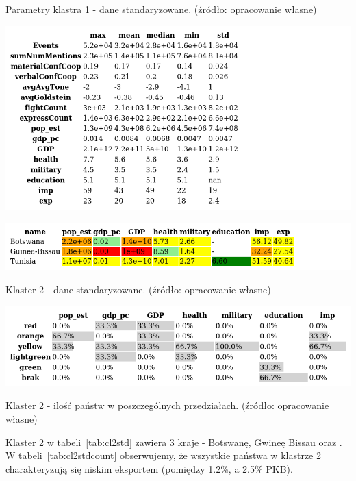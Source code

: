 \documentclass[11pt]{report}
\begin{document}
    \begin{table}[!htp]
        \centering
        \caption{Parametry klastra 1 - dane standaryzowane. (źródło: opracowanie własne)}
        \label{tab:cl1std_desc}
        \includegraphics[width=\linewidth]{tables/CLUST/desc/clust1std_desc.png}
    \end{table}

    \begin{table}[!htp]
        \centering
        \includegraphics[width=\linewidth]{tables/CLUST/cluster2stdkmeans.png}
        \caption{Klaster 2 - dane standaryzowane. (źródło: opracowanie własne)}
        \label{tab:cl2std}
    \end{table}

    \begin{table}[!htp]
        \centering
        \includegraphics[width=\linewidth]{tables/CLUST/cluster2stdkmeanscount.png}
        \caption{Klaster 2 - ilość państw w poszczególnych przedziałach. (źródło: opracowanie własne)}
        \label{tab:cl2stdcount}
    \end{table}

    Klaster 2 w tabeli~\ref{tab:cl2std} zawiera 3 kraje - Botswanę, Gwineę Bissau oraz .
    W tabeli~\ref{tab:cl2stdcount} obserwujemy, że wszystkie państwa w klastrze 2 charakteryzują się niskim eksportem (pomiędzy 1.2\%, a 2.5\% PKB).
\end{document}
